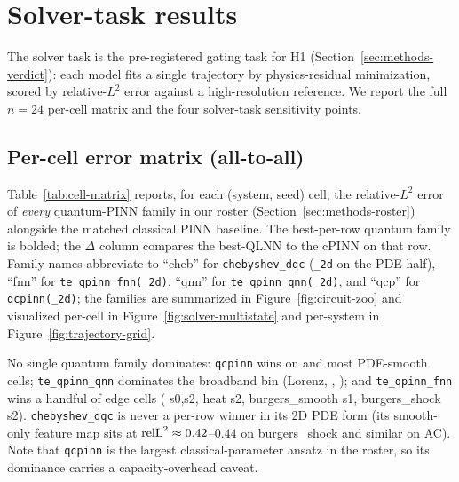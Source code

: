 
\section{Solver-task results}
\label{sec:solver}

The solver task is the pre-registered gating task for H1
(Section~\ref{sec:methods-verdict}): each model fits a single
trajectory by physics-residual minimization, scored by relative-$L^2$
error against a high-resolution reference. We report the full $n=24$
per-cell matrix and the four solver-task sensitivity points.

\subsection{Per-cell error matrix (all-to-all)}
\label{sec:solver-cells}

Table~\ref{tab:cell-matrix} reports, for each (system, seed)
cell, the relative-$L^2$ error of \emph{every} quantum-PINN
family in our roster (Section~\ref{sec:methods-roster}) alongside
the matched classical PINN baseline. The best-per-row quantum family is
bolded; the $\Delta$ column compares the best-QLNN to the cPINN on that
row. Family names abbreviate to ``cheb'' for \texttt{chebyshev\_dqc}
(\texttt{\_2d} on the PDE half), ``fnn'' for
\texttt{te\_qpinn\_fnn(\_2d)}, ``qnn'' for
\texttt{te\_qpinn\_qnn(\_2d)}, and ``qcp'' for \texttt{qcpinn(\_2d)};
the families are summarized in Figure~\ref{fig:circuit-zoo} and
visualized per-cell in Figure~\ref{fig:solver-multistate} and
per-system in Figure~\ref{fig:trajectory-grid}.

No single quantum family dominates: \texttt{qcpinn}
wins on \lv{} and most PDE-smooth cells; \texttt{te\_qpinn\_qnn}
dominates the broadband bin (Lorenz, \fhn{}, \ac{}); and
\texttt{te\_qpinn\_fnn} wins a handful of edge cells
(\vdp{} s0,s2, heat s2, burgers\_smooth s1, burgers\_shock s2).
\texttt{chebyshev\_dqc} is never a per-row winner in its 2D PDE form
(its smooth-only feature map sits at $\mathrm{relL}^2 \approx 0.42$--$0.44$ on
burgers\_shock and similar on AC). Note that \texttt{qcpinn} is the
largest classical-parameter ansatz in the roster, so its \lv{}
dominance carries a capacity-overhead caveat.

